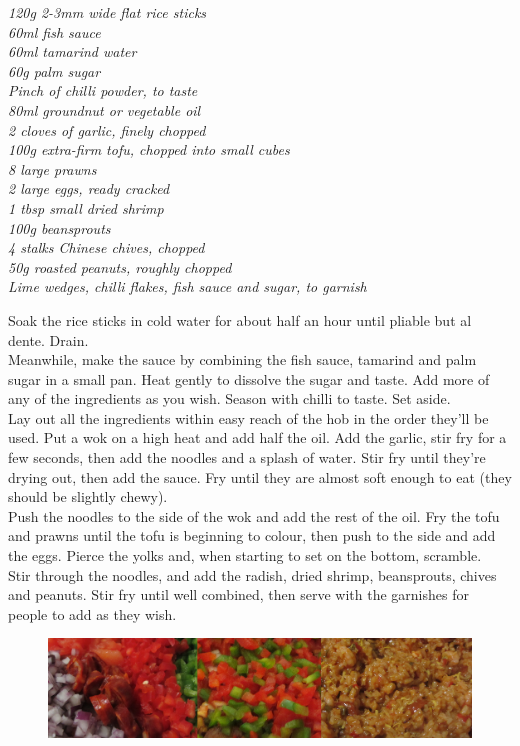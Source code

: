 \documentclass{tufte-book}
\begin{document}
\emph{120g 2-3mm wide flat rice sticks
\\60ml fish sauce
\\60ml tamarind water
\\60g palm sugar
\\Pinch of chilli powder, to taste
\\80ml groundnut or vegetable oil
\\2 cloves of garlic, finely chopped
\\100g extra-firm tofu, chopped into small cubes
\\8 large prawns
\\2 large eggs, ready cracked
\\1 tbsp small dried shrimp
\\100g beansprouts
\\4 stalks Chinese chives, chopped
\\50g roasted peanuts, roughly chopped
\\Lime wedges, chilli flakes, fish sauce and sugar, to garnish}

Soak the rice sticks in cold water for about half an hour until pliable but al dente. Drain.
\\Meanwhile, make the sauce by combining the fish sauce, tamarind and palm sugar in a small pan. Heat gently to dissolve the sugar and taste. Add more of any of the ingredients as you wish. Season with chilli to taste. Set aside.
\\Lay out all the ingredients within easy reach of the hob in the order they'll be used. Put a wok on a high heat and add half the oil. Add the garlic, stir fry for a few seconds, then add the noodles and a splash of water. Stir fry until they're drying out, then add the sauce. Fry until they are almost soft enough to eat (they should be slightly chewy).
\\Push the noodles to the side of the wok and add the rest of the oil. Fry the tofu and prawns until the tofu is beginning to colour, then push to the side and add the eggs. Pierce the yolks and, when starting to set on the bottom, scramble.
\\Stir through the noodles, and add the radish, dried shrimp, beansprouts, chives and peanuts. Stir fry until well combined, then serve with the garnishes for people to add as they wish.


\begin{figure}[h]
  \includegraphics[width=\linewidth]{paella.png}
\end{figure}
\end{document}
